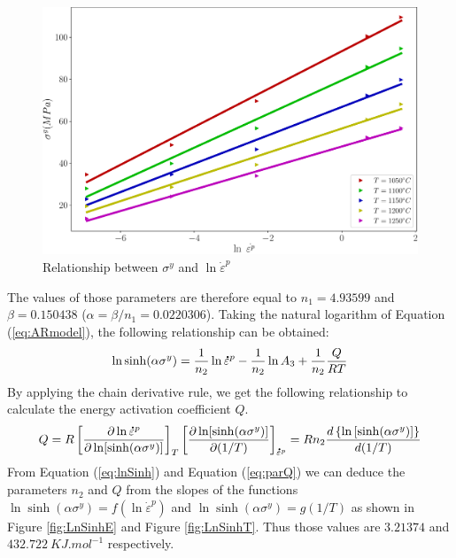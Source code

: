 \documentclass[twoside,english,1p,final,sort&compress]{elsarticle}
\theoremstyle{plain}
\newcommand{\mdot}[1]{\accentset{\mbox{\bfseries .}}{#1}}
\begin{document}
\begin{figure}[!ht]
\centering
\includegraphics[width=0.9\columnwidth]{newFigures/LnSinhE0}
\caption{Relationship between $\sigma^y$ and $\ln \dot{\varepsilon}^p$}
\label{fig:LnSinhE0}
\end{figure}
The values of those parameters are therefore equal to $n_1=4.93599$ and $\beta=0.150438$ ($\alpha=\beta/n_1 = 0.0220306$). 
Taking the natural logarithm of Equation (\ref{eq:ARmodel}), the following relationship can be obtained:
\begin{equation}
\label{eq:lnSinh}
\ln\sinh(\alpha\sigma^y) = \frac{1}{n_2}\ln \mdot{\varepsilon}^p  -  \frac{1}{n_2}\ln A_3 + \frac{1}{n_2} \frac{Q}{RT}
\end{equation}
By applying the chain derivative rule, we get the following relationship to calculate the energy activation coefficient $Q$.
\begin{equation}
\label{eq:parQ}
Q = R\left[\frac{\partial \ln \mdot{\varepsilon}^p}{\partial \ln [\sinh(\alpha\sigma^y)]}\right]_{T}\left[\frac{\partial \ln [\sinh(\alpha\sigma^y)]}{\partial (1/T)}\right]_{\mdot{\varepsilon}^p}= Rn_2\frac{d\left\{\ln\left[\sinh(\alpha\sigma^y)\right]\right\}}{d(1/T)}
\end{equation}
From Equation (\ref{eq:lnSinh}) and Equation (\ref{eq:parQ}) we can deduce the parameters $n_2 $ and $Q $ from the slopes of the functions $\ln \sinh(\alpha\sigma^y) = f(\ln \dot{\varepsilon}^p)$ and $\ln \sinh(\alpha\sigma^y) = g(1/T)$ as shown in Figure \ref{fig:LnSinhE} and Figure \ref{fig:LnSinhT}. Thus those values are $3.21374$ and $432.722\ KJ.mol^{-1}$ respectively.
\end{document}
